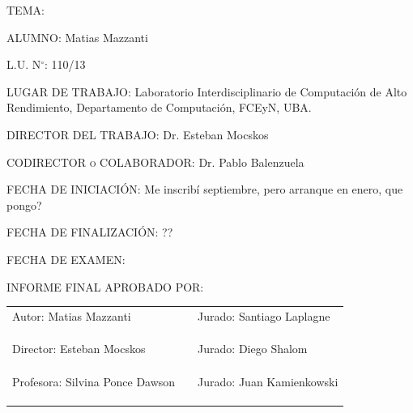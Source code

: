 \documentclass[11pt,twoside,spanish]{report} %
\begin{document}
\begin{center}
	\raggedright
	\textsc{TEMA:}

	\bigskip

	\textsc{ALUMNO:} Matias Mazzanti

	\bigskip

	\textsc{L.U. N$^{\circ}$:} 110/13

	\bigskip

	\textsc{LUGAR DE TRABAJO:} Laboratorio Interdisciplinario de Computaci\'on de
	Alto Rendimiento, Departamento de Computaci\'on, FCEyN, UBA.


	\bigskip

	\textsc{DIRECTOR DEL TRABAJO:} Dr. Esteban Mocskos

	\bigskip

	\textsc{CODIRECTOR o COLABORADOR:} Dr. Pablo Balenzuela

	\bigskip

	\textsc{FECHA DE INICIACI\'ON:} Me inscrib\'i septiembre, pero arranque en enero, que pongo?

	\bigskip

	\textsc{FECHA DE FINALIZACI\'ON:} ??

	\bigskip

	{\large FECHA DE EXAMEN: }

	\bigskip

	\textsc{INFORME FINAL APROBADO POR:}
	\vfill

	\begin{center}
		\begin{tabular}{lll}
			\cline{1-1}\cline{1-1}\cline{3-3}\cline{3-3}%
			Autor: Matias Mazzanti  & \hspace{2cm} & Jurado: Santiago Laplagne \\ 
			&& \\
			&& \\
			&& \\
			\cline{1-1}\cline{1-1}\cline{3-3}\cline{3-3}%
			Director: Esteban Mocskos & \hspace{2cm}  & Jurado: Diego Shalom \\
			&& \\
			&& \\
			&& \\
			\cline{1-1}\cline{1-1}\cline{3-3}\cline{3-3}%
			Profesora: Silvina Ponce Dawson  & \hspace{2cm} & Jurado: Juan Kamienkowski \\
			&& \\
			&& \\
			&& 
		\end{tabular}
	\end{center}

\end{center}
\end{document}
